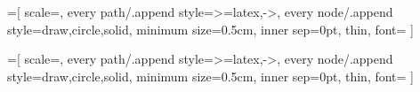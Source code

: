 =[
    scale=\mytikzscale,
    every path/.append style={>=latex,->},
    every node/.append style={draw,circle,solid},
    minimum size=0.5cm,
    inner sep=0pt,
    thin,
    font=\mytikznormalfontsize
]

=[
    scale=\mytikzscale,
    every path/.append style={>=latex,->},
    every node/.append style={draw,circle,solid},
    minimum size=0.5cm,
    inner sep=0pt,
    thin,
    font=\mytikznormalfontsize
]


